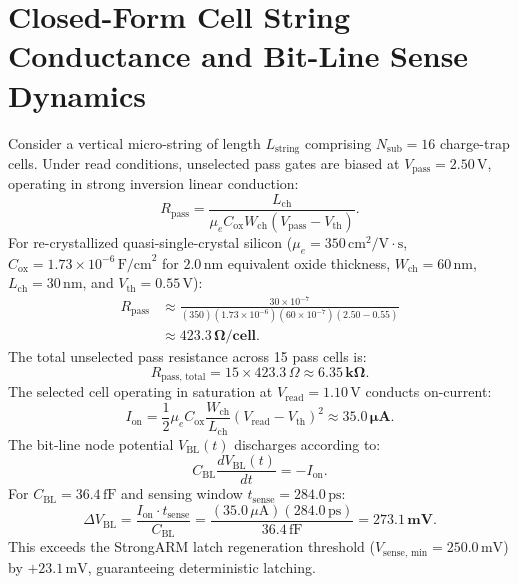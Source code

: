 \documentclass[journal]{IEEEtran}
\begin{document}
\section{Closed-Form Cell String Conductance and Bit-Line Sense Dynamics}
\label{sec:appendix_string_conductance}
Consider a vertical micro-string of length $L_{\text{string}}$ comprising $N_{\text{sub}} = 16$ charge-trap cells. Under read conditions, unselected pass gates are biased at $V_{\text{pass}} = 2.50\,\text{V}$, operating in strong inversion linear conduction:
\begin{equation}
    R_{\text{pass}} = \frac{L_{\text{ch}}}{\mu_e C_{\text{ox}} W_{\text{ch}} (V_{\text{pass}} - V_{\text{th}})}.
\end{equation}
For re-crystallized quasi-single-crystal silicon ($\mu_e = 350\,\text{cm}^2/\text{V}\cdot\text{s}$, $C_{\text{ox}} = 1.73 \times 10^{-6}\,\text{F/cm}^2$ for $2.0\,\text{nm}$ equivalent oxide thickness, $W_{\text{ch}} = 60\,\text{nm}$, $L_{\text{ch}} = 30\,\text{nm}$, and $V_{\text{th}} = 0.55\,\text{V}$):
\begin{align}
    R_{\text{pass}} &\approx \frac{30 \times 10^{-7}}{(350) (1.73 \times 10^{-6}) (60 \times 10^{-7}) (2.50 - 0.55)} \nonumber \\
    &\approx \mathbf{423.3\,\Omega/\text{cell}}.
\end{align}
The total unselected pass resistance across 15 pass cells is:
\begin{equation}
    R_{\text{pass, total}} = 15 \times 423.3\,\Omega \approx \mathbf{6.35\,\text{k}\Omega}.
\end{equation}
The selected cell operating in saturation at $V_{\text{read}} = 1.10\,\text{V}$ conducts on-current:
\begin{equation}
    I_{\text{on}} = \frac{1}{2} \mu_e C_{\text{ox}} \frac{W_{\text{ch}}}{L_{\text{ch}}} (V_{\text{read}} - V_{\text{th}})^2 \approx \mathbf{35.0\,\mu\text{A}}.
\end{equation}
The bit-line node potential $V_{\text{BL}}(t)$ discharges according to:
\begin{equation}
    C_{\text{BL}} \frac{d V_{\text{BL}}(t)}{dt} = -I_{\text{on}}.
\end{equation}
For $C_{\text{BL}} = 36.4\,\text{fF}$ and sensing window $t_{\text{sense}} = 284.0\,\text{ps}$:
\begin{equation}
    \Delta V_{\text{BL}} = \frac{I_{\text{on}} \cdot t_{\text{sense}}}{C_{\text{BL}}} = \frac{(35.0\,\mu\text{A}) (284.0\,\text{ps})}{36.4\,\text{fF}} = \mathbf{273.1\,\text{mV}}.
\end{equation}
This exceeds the StrongARM latch regeneration threshold ($V_{\text{sense, min}} = 250.0\,\text{mV}$) by $+23.1\,\text{mV}$, guaranteeing deterministic latching.
\end{document}
